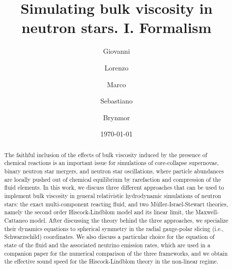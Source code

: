 \documentclass[aps,prd,twocolumn,a4paper,floatfix,nofootbib,superscriptaddress,nofootinbib]{revtex4}
\begin{document}
\title{Simulating bulk viscosity in neutron stars. I. Formalism}
\author{Giovanni }
\author{Lorenzo }
\author{Marco }
\author{Sebastiano }
\author{Brynmor }
\date{\today}

\begin{abstract}
%
The faithful inclusion of the effects of bulk viscosity induced by the presence
of chemical reactions is an important issue for simulations of core-collapse
supernovae, binary neutron star mergers, and neutron star oscillations, where
particle abundances are locally pushed out of chemical equilibrium by
rarefaction and compression of the fluid elements.
%
In this work, we discuss three different approaches that can be used to
implement bulk viscosity in general relativistic hydrodynamic simulations of
neutron stars: the exact multi-component reacting fluid, and two
M\"uller-Israel-Stewart theories, namely the second order Hiscock-Lindblom
model and its linear limit, the Maxwell-Cattaneo model.
%
After discussing the theory behind the three approaches, we specialize their
dynamics equations to spherical symmetry in the radial gauge-polar slicing
(i.e., Schwarzschild) coordinates.  We also discuss a particular choice for the
equation of state of the fluid and the associated neutrino emission rates,
which are used in a companion paper for the numerical comparison of the three
frameworks, and we obtain the effective sound speed for the Hiscock-Lindblom
theory in the non-linear regime.
%
\end{abstract}

\maketitle
\end{document}
